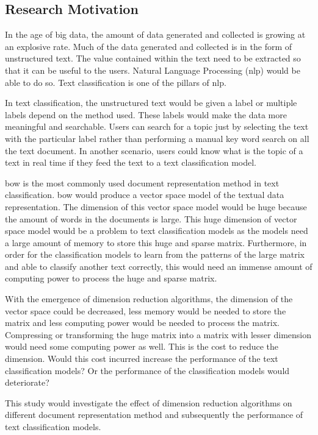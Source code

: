 \clearpage
\subsection{Research Motivation}
In the age of big data, the amount of data generated and collected is growing at an explosive rate. Much of the data generated and collected is in the form of unstructured text. The value contained within the text need to be extracted so that it can be useful to the users. Natural Language Processing (\ac{nlp}) would be able to do so. Text classification is one of the pillars of \ac{nlp}.

In text classification, the unstructured text would be given a label or multiple labels depend on the method used. These labels would make the data more meaningful and searchable. Users can search for a topic just by selecting the text with the particular label rather than performing a manual key word search on all the text document. In another scenario, users could know what is the topic of a text in real time if they feed the text to a text classification model.

\ac{bow} is the most commonly used document representation method in text classification. \Ac{bow} would produce a vector space model of the textual data representation. The dimension of this vector space model would be huge because the amount of words in the documents is large. This huge dimension of vector space model would be a problem to text classification models as the models need a large amount of memory to store this huge and sparse matrix. Furthermore, in order for the classification models to learn from the patterns of the large matrix and able to classify another text correctly, this would need an immense amount of computing power to process the huge and sparse matrix.

With the emergence of dimension reduction algorithms, the dimension of the vector space could be decreased, less memory would be needed to store the matrix and less computing power would be needed to process the matrix. Compressing or transforming the huge matrix into a matrix with lesser dimension would need some computing power as well. This is the cost to reduce the dimension. Would this cost incurred increase the performance of the text classification models? Or the performance of the classification models would deteriorate?

This study would investigate the effect of dimension reduction algorithms on different document representation method and subsequently the performance of text classification models.\\

